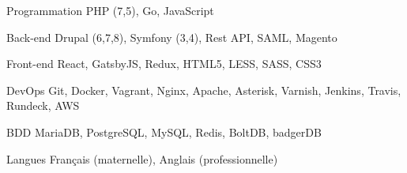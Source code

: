 

\begin{cvskills}

  \cvskill
    {Programmation} %
    {PHP (7,5), Go, JavaScript} %

  \cvskill
    {Back-end} %
    {Drupal (6,7,8), Symfony (3,4), Rest API, SAML, Magento} %

  \cvskill
    {Front-end} %
    {React, GatsbyJS, Redux, HTML5, LESS, SASS, CSS3} %

  \cvskill
    {DevOps} %
    {Git, Docker, Vagrant, Nginx, Apache, Asterisk, Varnish, Jenkins, Travis, Rundeck, AWS} %

  \cvskill
    {BDD} %
    {MariaDB, PostgreSQL, MySQL, Redis, BoltDB, badgerDB} %

  \cvskill
    {Langues} %
    {Français (maternelle), Anglais (professionnelle)} %

\end{cvskills}
